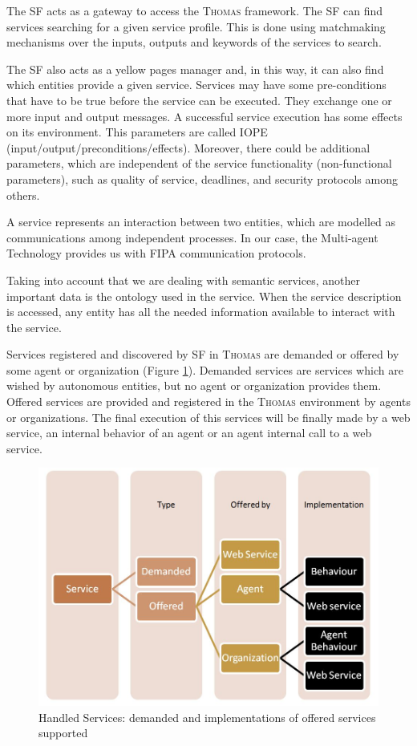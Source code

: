 The SF acts as a gateway to access the \textsc{Thomas} framework. The SF can find services searching for a given service profile. This is done using matchmaking mechanisms over the inputs, outputs and keywords of the services to search.

The SF also acts as a yellow pages manager and, in this way, it can also find which entities provide a given service. Services may have some pre-conditions that have to be true before the service can be executed. They exchange one or more input and output messages. A successful service execution has some effects on its environment. This parameters are called IOPE (input/output/preconditions/effects). Moreover, there could be additional parameters, which are independent of the service functionality (non-functional parameters), such as quality of service, deadlines, and security protocols among others. 


A service represents an interaction between two entities, which are modelled as communications among independent processes. In our case, the Multi-agent Technology provides us with FIPA communication protocols.

Taking into account that we are dealing with semantic services, another important data is the ontology used in the service. When the service description is accessed, any entity has all the needed information available to interact with the service. 

Services registered and discovered by SF in \textsc{Thomas} are demanded or offered by some agent or organization (Figure \ref{fig:handledServices}). Demanded services are services which are wished by autonomous entities, but no agent or organization provides them. Offered services are provided and registered in the \textsc{Thomas} environment by agents or organizations. The final execution of this services will be finally made by a web service, an internal behavior of an agent or an agent internal call to a web service.

\begin{figure}[h!t]
	\centering
	\includegraphics[width=.8\textwidth]{Thomas/images/handledServices.jpg}
	\caption{Handled Services: demanded and implementations of offered services supported}
	\label{fig:handledServices}
\end{figure}


